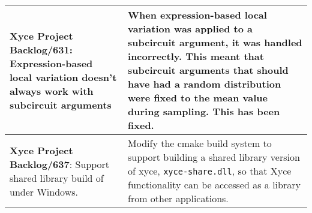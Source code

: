 {\begin{longtable}[h] {>{\raggedright\small}m{2in}|>{\raggedright\let\\\tabularnewline\small}m{3.5in}}
 \textbf{Xyce Project Backlog/631}: 
  Expression-based local variation doesn't always work with subcircuit arguments & 
  When expression-based local variation was applied to a subcircuit argument, it 
  was handled incorrectly.  This meant that subcircuit arguments that should have 
  had a random distribution were fixed to the mean value during sampling.  
  This has been fixed.  \\ \hline

  \textbf{Xyce Project Backlog/637}: Support shared library build of \Xyce{} under Windows.
  &  Modify the cmake build system to support building a shared library version of xyce, \texttt{xyce-share.dll}, so that 
  Xyce functionality can be accessed as a library from other applications.
  \\\hline


\end{longtable}
}
